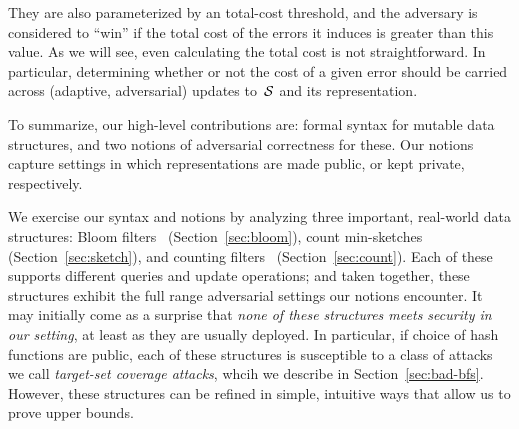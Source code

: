 They are also parameterized by an total-cost threshold, and
the adversary is considered to ``win'' if the total cost of the errors it induces
is greater than this value.  As we will see, even calculating the
total cost is not straightforward.  In particular, determining whether
or not the cost of a given error should be carried across (adaptive,
adversarial) updates to~$\mathcal{S}$ and its representation.

To summarize, our high-level contributions are: formal syntax for
mutable data structures, and two notions of adversarial
correctness for these.  Our notions capture settings in which representations
are made public, or kept private, respectively.

We exercise our syntax and notions by analyzing three important, real-world data
structures: Bloom filters~\cite{bloom1970space} (Section~\ref{sec:bloom}), count
min-sketches~\cite{cormode2005improved} (Section~\ref{sec:sketch}), and counting
filters~\cite{fan2000summary} (Section~\ref{sec:count}). Each of these supports
different queries and update operations; and taken together, these structures
exhibit the full range adversarial settings our notions encounter. It may
initially come as a surprise that \emph{none of these structures meets security
in our setting}, at least as they are usually deployed. In particular, if choice
of hash functions are public, each of these structures is susceptible to a class
of attacks we call \emph{target-set coverage attacks}, whcih we describe in
Section~\ref{sec:bad-bfs}. However, these structures can be refined in simple,
intuitive ways that allow us to prove upper bounds.






